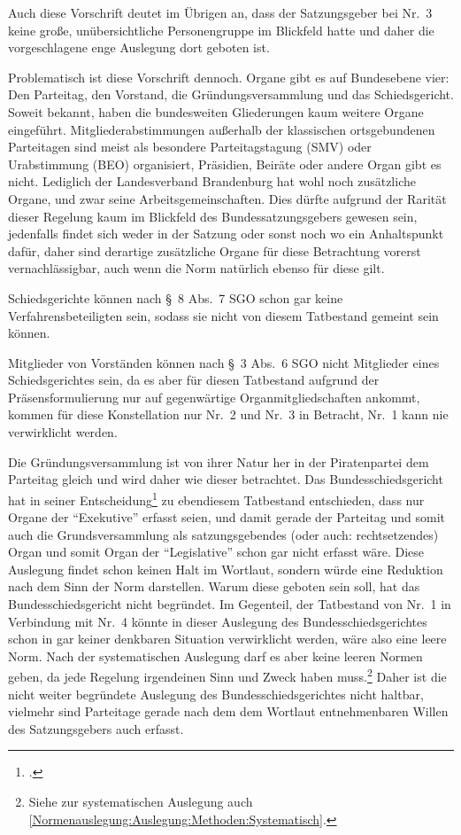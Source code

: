 Auch diese Vorschrift deutet im Übrigen an, dass der Satzungsgeber bei Nr.~3 keine große, unübersichtliche Personengruppe im Blickfeld hatte und daher die vorgeschlagene enge Auslegung dort geboten ist.

Problematisch ist diese Vorschrift dennoch.
Organe gibt es auf Bundesebene vier: Den Parteitag, den Vorstand, die Gründungsversammlung und das Schiedsgericht.
Soweit bekannt, haben die bundesweiten Gliederungen kaum weitere Organe eingeführt.
Mitgliederabstimmungen außerhalb der klassischen ortsgebundenen Parteitagen sind meist als besondere Parteitagstagung (SMV) oder Urabstimmung (BEO) organisiert, Präsidien, Beiräte oder andere Organ gibt es nicht.
Lediglich der Landesverband Brandenburg hat wohl noch zusätzliche Organe, und zwar seine Arbeitsgemeinschaften.
Dies dürfte aufgrund der Rarität dieser Regelung kaum im Blickfeld des Bundessatzungsgebers gewesen sein, jedenfalls findet sich weder in der Satzung oder sonst noch wo ein Anhaltspunkt dafür, daher sind derartige zusätzliche Organe für diese Betrachtung vorerst vernachlässigbar, auch wenn die Norm natürlich ebenso für diese gilt.

Schiedsgerichte können nach \S~8 Abs.~7 SGO schon gar keine Verfahrensbeteiligten sein, sodass sie nicht von diesem Tatbestand gemeint sein können.

Mitglieder von Vorständen können nach \S~3 Abs.~6 SGO nicht Mitglieder eines Schiedsgerichtes sein, da es aber für diesen Tatbestand aufgrund der Präsensformulierung nur auf gegenwärtige Organmitgliedschaften ankommt, kommen für diese Konstellation nur Nr.~2 und Nr.~3 in Betracht, Nr.~1 kann nie verwirklicht werden.

Die Gründungsversammlung ist von ihrer Natur her in der Piratenpartei dem Parteitag gleich und wird daher wie dieser betrachtet. Das Bundesschiedsgericht hat in seiner Entscheidung\footnote{\cite{BSGPP100127862}.} zu ebendiesem Tatbestand entschieden, dass nur Organe der \enquote{Exekutive} erfasst seien, und damit gerade der Parteitag und somit auch die Grundsversammlung als satzungsgebendes (oder auch: rechtsetzendes) Organ und somit Organ der \enquote{Legislative} schon gar nicht erfasst wäre.
Diese Auslegung findet schon keinen Halt im Wortlaut, sondern würde eine Reduktion nach dem Sinn der Norm darstellen.
Warum diese geboten sein soll, hat das Bundesschiedsgericht nicht begründet.
Im Gegenteil, der Tatbestand von Nr.~1 in Verbindung mit Nr.~4 könnte in dieser Auslegung des Bundesschiedsgerichtes schon in gar keiner denkbaren Situation verwirklicht werden, wäre also eine leere Norm.
Nach der systematischen Auslegung darf es aber keine leeren Normen geben, da jede Regelung irgendeinen Sinn und Zweck haben muss.\footnote{Siehe zur systematischen Auslegung auch \ref{Normenauslegung:Auslegung:Methoden:Systematisch}.}
Daher ist die nicht weiter begründete Auslegung des Bundesschiedsgerichtes nicht haltbar, vielmehr sind Parteitage gerade nach dem dem Wortlaut entnehmenbaren Willen des Satzungsgebers auch erfasst.

